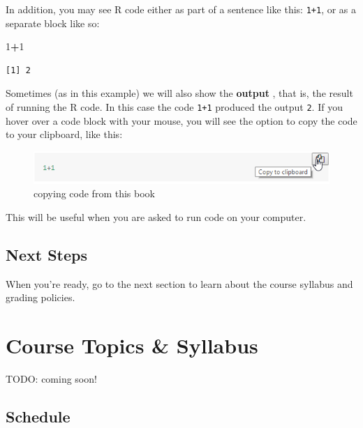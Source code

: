 \documentclass[
]{book}
\newenvironment{Shaded}{\begin{snugshade}}{\end{snugshade}}
\newcommand{\DecValTok}[1]{\textcolor[rgb]{0.00,0.00,0.81}{#1}}
\newcommand{\OperatorTok}[1]{\textcolor[rgb]{0.81,0.36,0.00}{\textbf{#1}}}
\begin{document}
In addition, you may see R code either as part of a sentence like this: \texttt{1+1}, or as a separate block like so:

\begin{Shaded}
\begin{Highlighting}[]
\DecValTok{1}\OperatorTok{+}\DecValTok{1}
\end{Highlighting}
\end{Shaded}

\begin{verbatim}
[1] 2
\end{verbatim}

Sometimes (as in this example) we will also show the \textbf{output} , that is, the result of running the R code. In this case the code \texttt{1+1} produced the output \texttt{2}.
If you hover over a code block with your mouse, you will see the option to copy the code to your clipboard, like this:

\begin{figure}

{\centering \includegraphics{src/images/copy_code} 

}

\caption{copying code from this book}\label{fig:unnamed-chunk-9}
\end{figure}

This will be useful when you are asked to run code on your computer.

\hypertarget{next-steps}{%
\subsection{Next Steps}\label{next-steps}}

When you're ready, go to the next section to learn about the course syllabus and grading policies.

\hypertarget{course-topics-syllabus}{%
\section{Course Topics \& Syllabus}\label{course-topics-syllabus}}

TODO: coming soon!

\hypertarget{schedule}{%
\subsection{Schedule}\label{schedule}}
\end{document}
